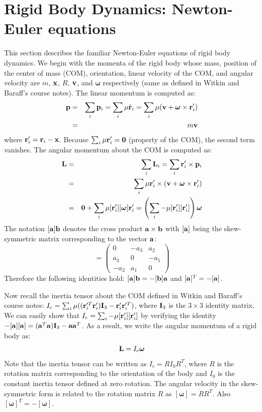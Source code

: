\section{Rigid Body Dynamics: Newton-Euler equations}
This section describes the familiar Newton-Euler equations of rigid
body dynamics. We begin with the momenta of the rigid body whose mass,
position of the center of mass (COM), orientation, linear velocity of
the COM, and angular velocity are $m$, $\mathbf{x}$, $R$, $\mathbf{v}$, and
$\bm{\omega}$ respectively (same as defined in Witkin and Baraff's
course notes). The linear momentum  is computed as:
\begin{eqnarray}
\mathbf{p} &=& \sum_i \mathbf{p}_i = \sum_i \mathbf{\mu} \dot{\mathbf{r}}_i = \sum_i  \mathbf{\mu} (\mathbf{v} + \bm{\omega}
    \times \mathbf{r}_i') \nonumber \\
 &=& m \mathbf{v}
\end{eqnarray}
where $\mathbf{r}_i' = \mathbf{r}_i - \mathbf{x}$. Because $\sum_i \mathbf{\mu}
\mathbf{r}_i' = \mathbf{0}$ (property of the COM), the second term vanishes. The angular momentum  about the COM is computed as:
\begin{eqnarray}
\nonumber
\mathbf{L} & = & \sum_i \mathbf{L}_i  = \sum_i \mathbf{r}_i' \times \mathbf{p}_i\\
\nonumber
& = & \sum_i \mathbf{\mu} \mathbf{r}_i' \times (\mathbf{v} + \bm{\omega} \times \mathbf{r}_i')\\
&= & \mathbf{0} + \sum_i \mathbf{\mu} [\mathbf{r}_i'][\bm{\omega}]\mathbf{r}_i' = \left ( \sum_i -\mathbf{\mu} [\mathbf{r}_i'][\mathbf{r}_i'] \right )\bm{\omega}
\end{eqnarray}
The notation $[\mathbf{a}] \mathbf{b}$ denotes the cross product $\mathbf{a}\times \mathbf{b}$ with $[\mathbf{a}]$ being the skew-symmetric matrix corresponding to the vector $\mathbf{a}$:
\begin{equation}
[\vc{a}] = 
\begin{pmatrix}
0 & -a_3 & a_2\\
a_3&  0 & -a_1\\
-a_2 & a_1 & 0
\end{pmatrix}
\end{equation}
Therefore the following identities hold: $[\mathbf{a}]\mathbf{b} = -[\mathbf{b}]\mathbf{a}$ and $[\mathbf{a}]^T = -[\mathbf{a}]$.

Now recall the inertia tensor about the COM defined in Witkin and
Baraff's course notes: $I_c = \sum_i \mathbf{\mu} ((\mathbf{r}_i'^T
\mathbf{r}_i')\mathbf{I}_3 - \mathbf{r}_i' \mathbf{r}_i'^T)$, where $\mathbf{I}_3$ is the $3\times 3$
identity matrix. We can easily show that
$I_c = \sum_i -\mathbf{\mu} [\mathbf{r}_i'][\mathbf{r}_i']$ by verifying the
identity $-[\mathbf{a}][\mathbf{a}] = (\mathbf{a}^T\mathbf{a}) \mathbf{I}_3  -
\mathbf{a}\mathbf{a}^T$. As a result, we write the angular momentum of a rigid body as:
\begin{equation}
\mathbf{L} = I_c \bm{\omega}
\end{equation}
Note that the inertia tensor can be written as $I_c = RI_0R^T$, where $R$ is the rotation matrix corresponding to the orientation of the body and $I_0$ is the constant inertia tensor defined at zero rotation. The angular velocity in the skew-symmetric form is related to the rotation matrix $R$ as $[\bm{\omega}] = \dot{R}R^T$. Also $[\bm{\omega}]^T = -[\bm{\omega}]$.

